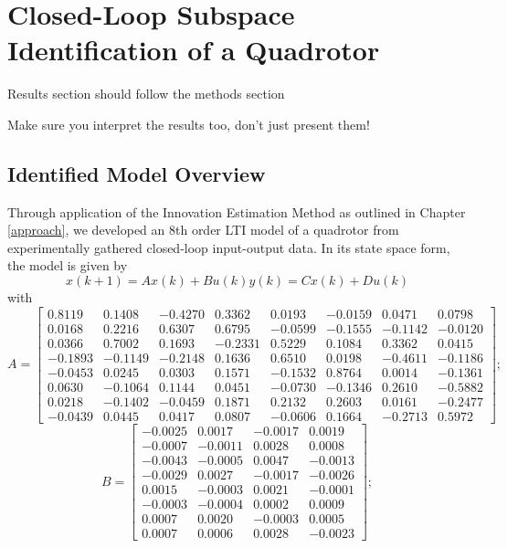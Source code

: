 \chapter{Closed-Loop Subspace Identification of a Quadrotor}\label{results}

Results section should follow the methods section

Make sure you interpret the results too, don't just present them!

\section{Identified Model Overview}
Through application of the Innovation Estimation Method as outlined in Chapter \ref{approach}, we developed an 8th order LTI model of a quadrotor from experimentally gathered closed-loop input-output data. In its state space form, the model is given by
\begin{subequations}\label{eq:2_lti}
\begin{equation*}x(k+1) = Ax(k) + Bu(k)\end{equation*}
\begin{equation*}y(k) = Cx(k) + Du(k)\end{equation*}
\end{subequations}
with
\footnotesize %
\begin{equation*}
A = \begin{bmatrix}
0.8119&0.1408&-0.4270&0.3362&0.0193&-0.0159&0.0471&0.0798\\
0.0168&0.2216&0.6307&0.6795&-0.0599&-0.1555&-0.1142&-0.0120\\
0.0366&0.7002&0.1693&-0.2331&0.5229&0.1084&0.3362&0.0415\\
-0.1893&-0.1149&-0.2148&0.1636&0.6510&0.0198&-0.4611&-0.1186\\
-0.0453&0.0245&0.0303&0.1571&-0.1532&0.8764&0.0014&-0.1361\\
0.0630&-0.1064&0.1144&0.0451&-0.0730&-0.1346&0.2610&-0.5882\\
0.0218&-0.1402&-0.0459&0.1871&0.2132&0.2603&0.0161&-0.2477\\
-0.0439&0.0445&0.0417&0.0807&-0.0606&0.1664&-0.2713&0.5972
\end{bmatrix};
\end{equation*}
\begin{equation*}
B = \begin{bmatrix}
   -0.0025&0.0017&-0.0017&0.0019\\
   -0.0007&-0.0011&0.0028&0.0008\\
   -0.0043&-0.0005&0.0047&-0.0013\\
   -0.0029&0.0027&-0.0017&-0.0026\\
    0.0015&-0.0003&0.0021&-0.0001\\
   -0.0003&-0.0004&0.0002&0.0009\\
    0.0007&0.0020&-0.0003&0.0005\\
    0.0007&0.0006&0.0028&-0.0023
\end{bmatrix};
\end{equation*}   
